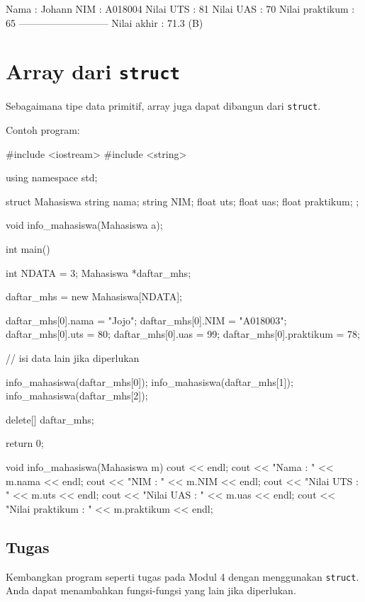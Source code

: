 \documentclass[a4paper,11pt]{extarticle}
\begin{document}
\begin{enumerate}
\begin{textcode}
Nama            : Johann
NIM             : A018004
Nilai UTS       : 81
Nilai UAS       : 70
Nilai praktikum : 65
---------------------------
Nilai akhir     : 71.3 (B)
\end{textcode}
\end{enumerate}



\section{Array dari \texttt{struct}}
Sebagaimana tipe data primitif, array juga dapat dibangun dari \texttt{struct}.

Contoh program:
\begin{cppcode}
#include <iostream>
#include <string>

using namespace std;

struct Mahasiswa
{
  string nama;
  string NIM;
  float uts;
  float uas;
  float praktikum;
};

void info_mahasiswa(Mahasiswa a);

int main()
{
  int NDATA = 3;
  Mahasiswa *daftar_mhs;

  daftar_mhs = new Mahasiswa[NDATA];

  daftar_mhs[0].nama = "Jojo";
  daftar_mhs[0].NIM = "A018003";
  daftar_mhs[0].uts = 80;
  daftar_mhs[0].uas = 99;
  daftar_mhs[0].praktikum = 78;
  
  // isi data lain jika diperlukan

  info_mahasiswa(daftar_mhs[0]);
  info_mahasiswa(daftar_mhs[1]);
  info_mahasiswa(daftar_mhs[2]);

  delete[] daftar_mhs;

  return 0;
}

void info_mahasiswa(Mahasiswa m)
{
  cout << endl;
  cout << "Nama            : " << m.nama << endl;
  cout << "NIM             : " << m.NIM << endl;
  cout << "Nilai UTS       : " << m.uts << endl;
  cout << "Nilai UAS       : " << m.uas << endl;
  cout << "Nilai praktikum : " << m.praktikum << endl;
}
\end{cppcode}

\subsection*{Tugas}
Kembangkan program seperti tugas pada Modul 4 dengan menggunakan \texttt{struct}.
Anda dapat menambahkan fungsi-fungsi yang lain jika diperlukan.
\end{document}
